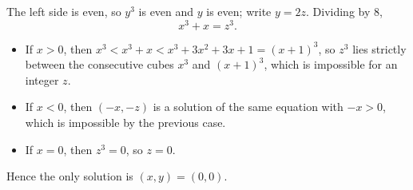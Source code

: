 The left side is even, so $y^3$ is even and $y$ is even; write $y=2z$. Dividing by $8$,
\[x^3+x=z^3 .\]
\begin{itemize}
\item If $x>0$, then $x^3<x^3+x<x^3+3x^2+3x+1=(x+1)^3$, so $z^3$ lies strictly between the consecutive cubes $x^3$ and $(x+1)^3$, which is impossible for an integer $z$.
\item If $x<0$, then $(-x,-z)$ is a solution of the same equation with $-x>0$, which is impossible by the previous case.
\item If $x=0$, then $z^3=0$, so $z=0$.
\end{itemize}
Hence the only solution is $\boxed{(x,y)=(0,0)}$.
